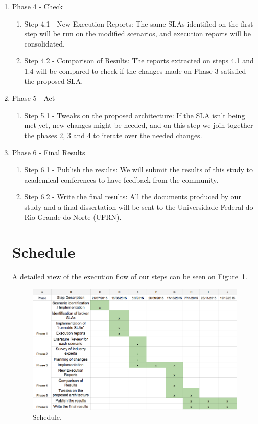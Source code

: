 \begin{enumerate}
\item{Phase 4 - Check}
   \begin{enumerate}
   \item {Step 4.1 - New Execution Reports: The same SLAs identified on the first step will be run on the modified scenarios, and execution reports will be consolidated.}
   \item {Step 4.2 - Comparison of Results: The reports extracted on steps 4.1 and 1.4 will be compared to check if the changes made on Phase 3 satisfied the proposed SLA.}
   \end{enumerate}

\item{Phase 5 - Act}
   \begin{enumerate}
   \item{Step 5.1 - Tweaks on the proposed architecture: If the SLA isn't being met yet, new changes might be needed, and on this step we join together the phases 2, 3 and 4 to iterate over the needed changes. }
   \end{enumerate}


\item{Phase 6 - Final Results}
   \begin{enumerate}
   \item{Step 6.1 - Publish the results: We will submit the results of this study to academical conferences to have feedback from the community. }
   \item{Step 6.2 - Write the final results: All the documents produced by our study and a final dissertation will be sent to the Universidade Federal do Rio Grande do Norte (UFRN).}
   \end{enumerate}

\section{Schedule}

A detailed view of the execution flow of our steps can be seen on Figure~\ref{fig:schedule}. 
\begin{figure}[ht!]
\centering
\includegraphics[width=140mm]{schedule.png}
\caption{Schedule.\label{fig:schedule}}
\end{figure}
\end{enumerate}


